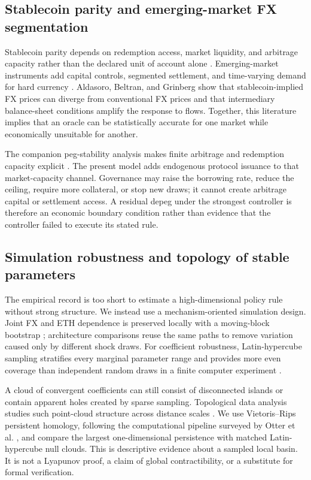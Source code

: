 \documentclass[sn-vancouver,Numbered]{sn-jnl}
\begin{document}
\subsection{Stablecoin parity and emerging-market FX segmentation}

Stablecoin parity depends on redemption access, market liquidity, and arbitrage capacity rather than the declared unit of account alone \cite{Lyons2023,Ma2023}. Emerging-market instruments add capital controls, segmented settlement, and time-varying demand for hard currency \cite{Auer2023}. Aldasoro, Beltran, and Grinberg \cite{Aldasoro2026} show that stablecoin-implied FX prices can diverge from conventional FX prices and that intermediary balance-sheet conditions amplify the response to flows. Together, this literature implies that an oracle can be statistically accurate for one market while economically unsuitable for another.

The companion peg-stability analysis makes finite arbitrage and redemption capacity explicit \cite{RokniLamouki2026Peg}. The present model adds endogenous protocol issuance to that market-capacity channel. Governance may raise the borrowing rate, reduce the ceiling, require more collateral, or stop new draws; it cannot create arbitrage capital or settlement access. A residual depeg under the strongest controller is therefore an economic boundary condition rather than evidence that the controller failed to execute its stated rule.

\subsection{Simulation robustness and topology of stable parameters}

The empirical record is too short to estimate a high-dimensional policy rule without strong structure. We instead use a mechanism-oriented simulation design. Joint FX and ETH dependence is preserved locally with a moving-block bootstrap \cite{Kunsch1989}; architecture comparisons reuse the same paths to remove variation caused only by different shock draws. For coefficient robustness, Latin-hypercube sampling stratifies every marginal parameter range and provides more even coverage than independent random draws in a finite computer experiment \cite{McKay1979}.

A cloud of convergent coefficients can still consist of disconnected islands or contain apparent holes created by sparse sampling. Topological data analysis studies such point-cloud structure across distance scales \cite{Carlsson2009}. We use Vietoris--Rips persistent homology, following the computational pipeline surveyed by Otter et al. \cite{Otter2017}, and compare the largest one-dimensional persistence with matched Latin-hypercube null clouds. This is descriptive evidence about a sampled local basin. It is not a Lyapunov proof, a claim of global contractibility, or a substitute for formal verification.
\end{document}

